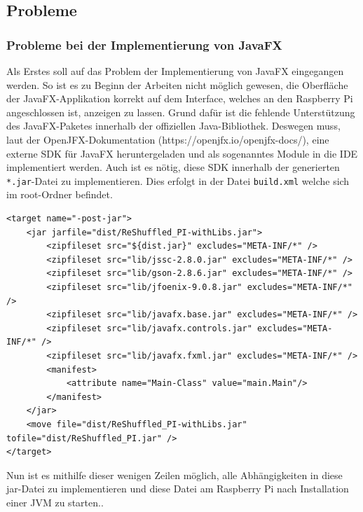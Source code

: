 \subsection{Probleme}
\subsubsection{Probleme bei der Implementierung von JavaFX}
Als Erstes soll auf das Problem der Implementierung von JavaFX eingegangen  werden.
So ist es zu Beginn der Arbeiten nicht möglich gewesen, die Oberfläche der JavaFX-Applikation korrekt auf dem Interface, welches an den Raspberry Pi angeschlossen ist, anzeigen zu lassen.
Grund dafür ist die fehlende Unterstützung des JavaFX-Paketes innerhalb der offiziellen Java-Bibliothek.
Deswegen muss, laut der OpenJFX-Dokumentation (https://openjfx.io/openjfx-docs/), eine externe SDK für JavaFX heruntergeladen und als sogenanntes Module in die IDE implementiert werden.
Auch ist es nötig, diese SDK innerhalb der generierten \lstinline[style=C]{*.jar}-Datei zu implementieren.
Dies erfolgt in der Datei \lstinline[style=C]{build.xml} welche sich im root-Ordner befindet.
\begin{lstlisting}[style=xml,caption=Teilabschnitt build.xml,label=build]
<target name="-post-jar">
    <jar jarfile="dist/ReShuffled_PI-withLibs.jar">
        <zipfileset src="${dist.jar}" excludes="META-INF/*" />
        <zipfileset src="lib/jssc-2.8.0.jar" excludes="META-INF/*" />
        <zipfileset src="lib/gson-2.8.6.jar" excludes="META-INF/*" />
        <zipfileset src="lib/jfoenix-9.0.8.jar" excludes="META-INF/*" />
        <zipfileset src="lib/javafx.base.jar" excludes="META-INF/*" />
        <zipfileset src="lib/javafx.controls.jar" excludes="META-INF/*" />
        <zipfileset src="lib/javafx.fxml.jar" excludes="META-INF/*" />
        <manifest>
            <attribute name="Main-Class" value="main.Main"/>
        </manifest>
    </jar>
    <move file="dist/ReShuffled_PI-withLibs.jar" tofile="dist/ReShuffled_PI.jar" />
</target>
\end{lstlisting}
Nun ist es mithilfe dieser wenigen Zeilen möglich, alle Abhängigkeiten in diese jar-Datei zu implementieren und diese Datei am Raspberry Pi nach Installation einer JVM zu starten..
